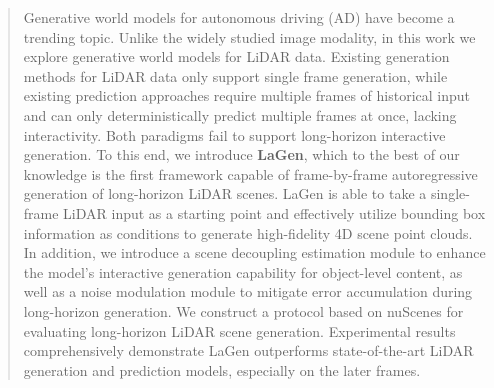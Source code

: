 \begin{abstract}
Generative world models for autonomous driving (AD) have become a trending topic. 
Unlike the widely studied image modality, in this work we explore generative world models for LiDAR data.
Existing generation methods for LiDAR data only support single frame generation, while existing prediction approaches require multiple frames of historical input and can only deterministically predict multiple frames at once, lacking interactivity.
Both paradigms fail to support long-horizon interactive generation.
To this end, we introduce \textbf{LaGen}, which to the best of our knowledge is the first framework capable of frame-by-frame autoregressive generation of long-horizon LiDAR scenes.
LaGen is able to take a single-frame LiDAR input as a starting point and effectively utilize bounding box information as conditions to generate high-fidelity 4D scene point clouds.
In addition, we introduce a scene decoupling estimation module to enhance the model's interactive generation capability for object-level content, as well as a noise modulation module to mitigate error accumulation during long-horizon generation.
We construct a protocol based on nuScenes for evaluating long-horizon LiDAR scene generation. 
Experimental results comprehensively demonstrate LaGen outperforms state-of-the-art LiDAR generation and prediction models, especially on the later frames.

\vspace{-4mm}

\end{abstract}